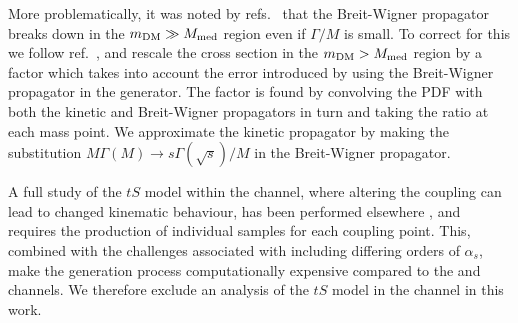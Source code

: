 More problematically, it was noted by refs.~\cite{NordstromSVD,An:2012va} that the Breit-Wigner propagator breaks down in the $m_{\mathrm{DM}} \gg M_{\mathrm{med}}$ region even if $\Gamma/M$ is small. To correct for this we follow ref.~\cite{NordstromSVD}, and rescale the cross section in the $m_{\mathrm{DM}} > M_{\mathrm{med}}$ region by a factor which takes into account the error introduced by using the Breit-Wigner propagator in the generator. The factor is found by convolving the PDF with both the kinetic and Breit-Wigner propagators in turn and taking the ratio at each mass point. We approximate the kinetic propagator by making the substitution $M \Gamma(M) \rightarrow s \Gamma(\sqrt{s}) / M$ in the Breit-Wigner propagator.

A full study of the $tS$ model within the \monojet channel, where altering the coupling can lead to changed kinematic behaviour, has been performed elsewhere \cite{Zurek:tchannel}, and requires the production of individual samples for each coupling point. This, combined with the challenges associated with including differing orders of $\alpha_s$, make the generation process computationally expensive compared to the \monoZ and \monoWZ channels. We therefore exclude an analysis of the $tS$ model in the \monojet channel in this work.



